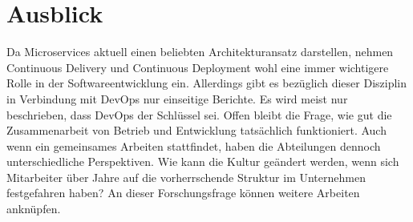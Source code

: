 \section{Ausblick}
Da Microservices aktuell einen beliebten Architekturansatz darstellen, nehmen Continuous Delivery und Continuous Deployment wohl eine immer wichtigere Rolle in der Softwareentwicklung ein. Allerdings gibt es bezüglich dieser Disziplin in Verbindung mit DevOps nur einseitige Berichte. Es wird meist nur beschrieben, dass DevOps der Schlüssel sei. Offen bleibt die Frage, wie gut die Zusammenarbeit von Betrieb und Entwicklung tatsächlich funktioniert. Auch wenn ein gemeinsames Arbeiten stattfindet, haben die Abteilungen dennoch unterschiedliche Perspektiven. Wie kann die Kultur geändert werden, wenn sich Mitarbeiter über Jahre auf die vorherrschende Struktur im Unternehmen festgefahren haben? An dieser Forschungsfrage können weitere Arbeiten anknüpfen. 


\ifCLASSOPTIONcaptionsoff
  \newpage
\fi